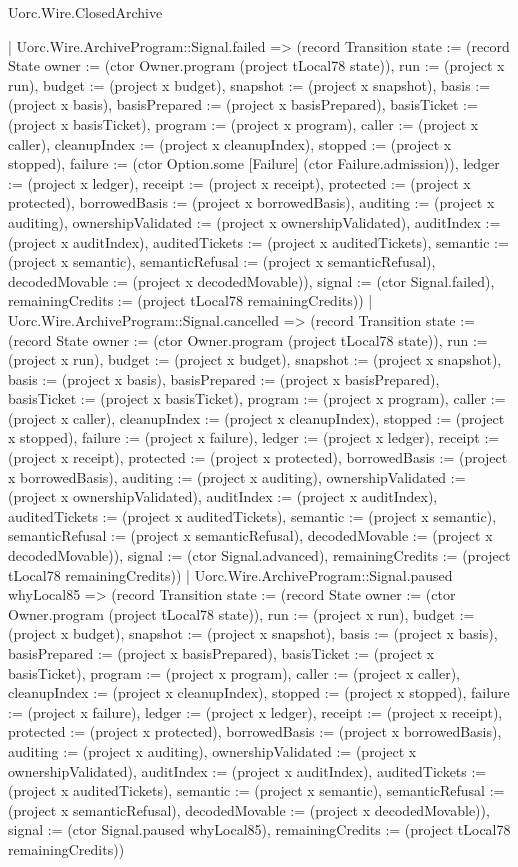 \begin{lexlean}{Uorc.Wire.ClosedArchive}
\begin{semanticmodule}
{    | Uorc.Wire.ArchiveProgram::Signal.failed => (record Transition {state := (record State {owner := (ctor Owner.program (project tLocal78 state)), run := (project x run), budget := (project x budget), snapshot := (project x snapshot), basis := (project x basis), basisPrepared := (project x basisPrepared), basisTicket := (project x basisTicket), program := (project x program), caller := (project x caller), cleanupIndex := (project x cleanupIndex), stopped := (project x stopped), failure := (ctor Option.some [Failure] (ctor Failure.admission)), ledger := (project x ledger), receipt := (project x receipt), protected := (project x protected), borrowedBasis := (project x borrowedBasis), auditing := (project x auditing), ownershipValidated := (project x ownershipValidated), auditIndex := (project x auditIndex), auditedTickets := (project x auditedTickets), semantic := (project x semantic), semanticRefusal := (project x semanticRefusal), decodedMovable := (project x decodedMovable)}), signal := (ctor Signal.failed), remainingCredits := (project tLocal78 remainingCredits)})
    | Uorc.Wire.ArchiveProgram::Signal.cancelled => (record Transition {state := (record State {owner := (ctor Owner.program (project tLocal78 state)), run := (project x run), budget := (project x budget), snapshot := (project x snapshot), basis := (project x basis), basisPrepared := (project x basisPrepared), basisTicket := (project x basisTicket), program := (project x program), caller := (project x caller), cleanupIndex := (project x cleanupIndex), stopped := (project x stopped), failure := (project x failure), ledger := (project x ledger), receipt := (project x receipt), protected := (project x protected), borrowedBasis := (project x borrowedBasis), auditing := (project x auditing), ownershipValidated := (project x ownershipValidated), auditIndex := (project x auditIndex), auditedTickets := (project x auditedTickets), semantic := (project x semantic), semanticRefusal := (project x semanticRefusal), decodedMovable := (project x decodedMovable)}), signal := (ctor Signal.advanced), remainingCredits := (project tLocal78 remainingCredits)})
    | Uorc.Wire.ArchiveProgram::Signal.paused whyLocal85 => (record Transition {state := (record State {owner := (ctor Owner.program (project tLocal78 state)), run := (project x run), budget := (project x budget), snapshot := (project x snapshot), basis := (project x basis), basisPrepared := (project x basisPrepared), basisTicket := (project x basisTicket), program := (project x program), caller := (project x caller), cleanupIndex := (project x cleanupIndex), stopped := (project x stopped), failure := (project x failure), ledger := (project x ledger), receipt := (project x receipt), protected := (project x protected), borrowedBasis := (project x borrowedBasis), auditing := (project x auditing), ownershipValidated := (project x ownershipValidated), auditIndex := (project x auditIndex), auditedTickets := (project x auditedTickets), semantic := (project x semantic), semanticRefusal := (project x semanticRefusal), decodedMovable := (project x decodedMovable)}), signal := (ctor Signal.paused whyLocal85), remainingCredits := (project tLocal78 remainingCredits)})
}
\end{semanticmodule}
\end{lexlean}
